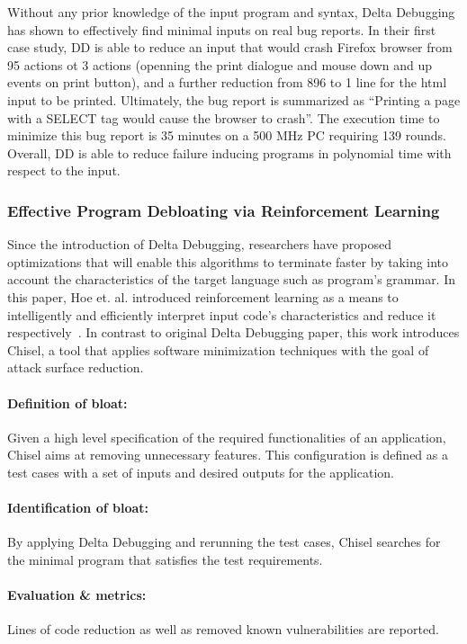 Without any prior knowledge of the input program and syntax, Delta Debugging has shown to effectively find minimal inputs on real bug reports. In their first case study, DD is able to reduce an input that would crash Firefox browser from 95 actions ot 3 actions (openning the print dialogue and mouse down and up events on print button), and a further reduction from 896 to 1 line for the html input to be printed. Ultimately, the bug report is summarized as ``Printing a page with a SELECT tag would cause the browser to crash''. The execution time to minimize this bug report is 35 minutes on a 500 MHz PC requiring 139 rounds. Overall, DD is able to reduce failure inducing programs in polynomial time with respect to the input.

\subsubsection{Effective Program Debloating via Reinforcement Learning}
Since the introduction of Delta Debugging, researchers have proposed optimizations that will enable this algorithms to terminate faster by taking into account the characteristics of the target language such as program's grammar. In this paper, Hoe et. al. introduced reinforcement learning as a means to intelligently and efficiently interpret input code's characteristics and reduce it respectively~\cite{heo2018effective}. In contrast to original Delta Debugging paper, this work introduces Chisel, a tool that applies software minimization techniques with the goal of attack surface reduction.

\paragraph{Definition of bloat:} Given a high level specification of the required functionalities of an application, Chisel aims at removing unnecessary features. This configuration is defined as a test cases with a set of inputs and desired outputs for the application.
\paragraph{Identification of bloat:} By applying Delta Debugging and rerunning the test cases, Chisel searches for the minimal program that satisfies the test requirements.
\paragraph{Evaluation \& metrics:} Lines of code reduction as well as removed known vulnerabilities are reported.

